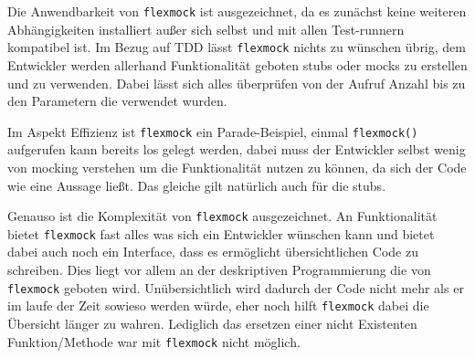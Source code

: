 Die Anwendbarkeit von \lstinline{flexmock} ist ausgezeichnet, da es zunächst
keine weiteren Abhängigkeiten installiert außer sich selbst und mit allen
Test-runnern kompatibel ist. Im Bezug auf TDD lässt \lstinline{flexmock} nichts
zu wünschen übrig, dem Entwickler werden allerhand Funktionalität geboten
\Glspl{stub} oder \Glspl{mock} zu erstellen und zu verwenden. Dabei lässt sich
alles überprüfen von der Aufruf Anzahl bis zu den Parametern die verwendet
wurden.

Im Aspekt Effizienz ist \lstinline{flexmock} ein Parade-Beispiel, einmal
\lstinline{flexmock()} aufgerufen kann bereits los gelegt werden, dabei muss der
Entwickler selbst wenig von \gls{mock}ing verstehen um die Funktionalität nutzen
zu können, da sich der Code wie eine Aussage ließt. Das gleiche gilt natürlich
auch für die \Glspl{stub}.

Genauso ist die Komplexität von \lstinline{flexmock} ausgezeichnet. An
Funktionalität bietet \lstinline{flexmock} fast alles was sich ein Entwickler
wünschen kann und bietet dabei auch noch ein Interface, dass es ermöglicht
übersichtlichen Code zu schreiben. Dies liegt vor allem an der deskriptiven
Programmierung die von \lstinline{flexmock} geboten wird. Unübersichtlich
wird dadurch der Code nicht mehr als er im laufe der Zeit sowieso werden würde,
eher noch hilft \lstinline{flexmock} dabei die Übersicht länger zu wahren.
Lediglich das ersetzen einer nicht Existenten Funktion/Methode war mit
\lstinline{flexmock} nicht möglich.